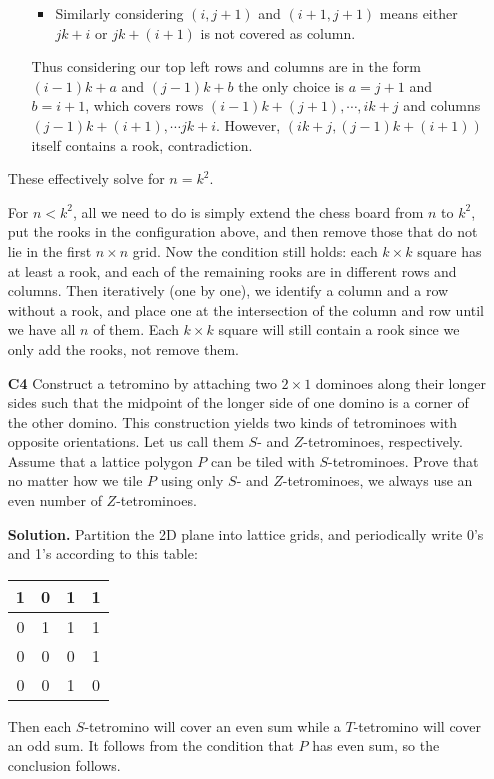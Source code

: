 \documentclass[11pt,a4paper]{article}
\begin{document}
\begin{enumerate}
\begin{itemize}
\begin{itemize}
			\item Similarly considering $(i, j+1)$ and $(i+1, j+1)$ means either $jk+i$ or $jk+(i+1)$ is not covered as column. 
		\end{itemize}
		Thus considering our top left rows and columns are in the form $(i-1)k+a$ and $(j-1)k+b$ the only choice is $a=j+1$ and $b=i+1$, which covers rows $(i-1)k+(j+1), \cdots , ik+j$ and columns $(j-1)k+(i+1), \cdots jk+i$. 
		However, $(ik+j, (j-1)k+(i+1))$ itself contains a rook, contradiction. 
	\end{itemize}
	These effectively solve for $n=k^2$. 
	
	For $n<k^2$, all we need to do is simply extend the chess board from $n$ to $k^2$, put the rooks in the configuration above, and then remove those that do not lie in the first $n\times n$ grid. Now the condition still holds: each $k\times k$ square has at least a rook, and each of the remaining rooks are in different rows and columns. Then iteratively (one by one), we identify a column and a row without a rook, and place one at the intersection of the column and row until we have all $n$ of them. Each $k\times k$ square will still contain a rook since we only add the rooks, not remove them. 
	
	\item[\textbf{C4}]
	Construct a tetromino by attaching two $2 \times 1$ dominoes along their longer sides such that the midpoint of the longer side of one domino is a corner of the other domino. This construction yields two kinds of tetrominoes with opposite orientations. Let us call them $S$- and $Z$-tetrominoes, respectively.
	Assume that a lattice polygon $P$ can be tiled with $S$-tetrominoes. Prove that no matter how we tile $P$ using only $S$- and $Z$-tetrominoes, we always use an even number of $Z$-tetrominoes.
	
	\textbf{Solution.} 
	Partition the 2D plane into lattice grids, and periodically write 0's and 1's according to this table: 
	
	\begin{center}
		\begin{tabular}{|c|c|c|c|}
			\hline
			1 & 0 & 1 & 1\\
			\hline 
			0 & 1 & 1 & 1\\
			\hline 
			0 & 0 & 0 & 1\\
			\hline 
			0 & 0 & 1 & 0\\
			\hline
		\end{tabular}
	\end{center}
    Then each $S$-tetromino will cover an even sum while a $T$-tetromino will cover an odd sum. 
    It follows from the condition that $P$ has even sum, so the conclusion follows. 
    

\end{enumerate}
\end{document}
